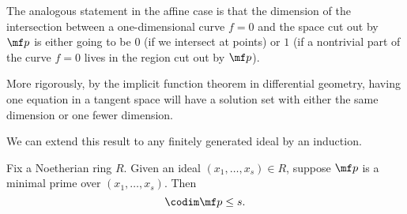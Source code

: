 \begin{remark} \label{rem:geometricpit}
	The analogous statement in the affine case is that the dimension of the intersection between a one-dimensional curve $f=0$ and the space cut out by $\mf p$ is either going to be $0$ (if we intersect at points) or $1$ (if a nontrivial part of the curve $f=0$ lives in the region cut out by $\mf p$).
	
	More rigorously, by the implicit function theorem in differential geometry, having one equation in a tangent space will have a solution set with either the same dimension or one fewer dimension.
\end{remark}
We can extend this result to any finitely generated ideal by an induction.
\begin{theorem} \label{thm:pit}
	Fix a Noetherian ring $R$. Given an ideal $(x_1,\ldots,x_s)\in R$, suppose $\mf p$ is a minimal prime over $(x_1,\ldots,x_s)$. Then
	\[\codim\mf p\le s.\]
\end{theorem}
